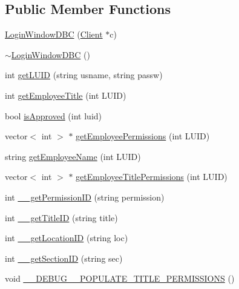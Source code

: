 \subsection*{Public Member Functions}
\begin{DoxyCompactItemize}
\item 
\hyperlink{class_login_window_d_b_c_ae751a2d004e0874772ec7c12a34dacc2}{Login\+Window\+D\+B\+C} (\hyperlink{class_client}{Client} $\ast$c)
\item 
\hyperlink{class_login_window_d_b_c_a74ac48791d65e2e8b286c12399af8fc0}{$\sim$\+Login\+Window\+D\+B\+C} ()
\item 
int \hyperlink{class_login_window_d_b_c_a70ab4fd5cd3f19fcf79ecad03ee6b57a}{get\+L\+U\+I\+D} (string usname, string passw)
\item 
int \hyperlink{class_login_window_d_b_c_a817321d38f4d5cf67cf07880171371ba}{get\+Employee\+Title} (int L\+U\+I\+D)
\item 
bool \hyperlink{class_login_window_d_b_c_abc5781f6a702a3f5cdfb70e4e6d4e166}{is\+Approved} (int luid)
\item 
vector$<$ int $>$ $\ast$ \hyperlink{class_login_window_d_b_c_a3f3f7784966a764722ee02f416e567aa}{get\+Employee\+Permissions} (int L\+U\+I\+D)
\item 
string \hyperlink{class_login_window_d_b_c_a5d4886888cc67d244de43870bf1856d6}{get\+Employee\+Name} (int L\+U\+I\+D)
\item 
vector$<$ int $>$ $\ast$ \hyperlink{class_login_window_d_b_c_a7b89aa618d16011e0f5f9750a6c79f2c}{get\+Employee\+Title\+Permissions} (int L\+U\+I\+D)
\item 
int \hyperlink{class_login_window_d_b_c_a83566dae5d83cf54809cb4cbc5346749}{\+\_\+\+\_\+get\+Permission\+I\+D} (string permission)
\item 
int \hyperlink{class_login_window_d_b_c_af8abcaf2f6db1609c9ab3500b16d3466}{\+\_\+\+\_\+get\+Title\+I\+D} (string title)
\item 
int \hyperlink{class_login_window_d_b_c_a7af132356ff7d9544554a55d08cb257e}{\+\_\+\+\_\+get\+Location\+I\+D} (string loc)
\item 
int \hyperlink{class_login_window_d_b_c_a4f6b5b4c9b2777a749dccd5cd74abeab}{\+\_\+\+\_\+get\+Section\+I\+D} (string sec)
\item 
void \hyperlink{class_login_window_d_b_c_a22f3cb1638c146d547bb38087dfd947a}{\+\_\+\+\_\+\+D\+E\+B\+U\+G\+\_\+\+\_\+\+P\+O\+P\+U\+L\+A\+T\+E\+\_\+\+T\+I\+T\+L\+E\+\_\+\+P\+E\+R\+M\+I\+S\+S\+I\+O\+N\+S} ()
\end{DoxyCompactItemize}
